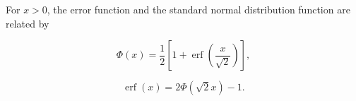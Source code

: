 For $x > 0$, the error function and the standard normal distribution function are related by

$$\Phi(x) = \frac{1}{2} \left[ 1 + \operatorname{erf}\left(\frac{x}{\sqrt{2}}\right) \right],$$

$$\operatorname{erf}(x) = 2\Phi(\sqrt{2}x) - 1.$$
